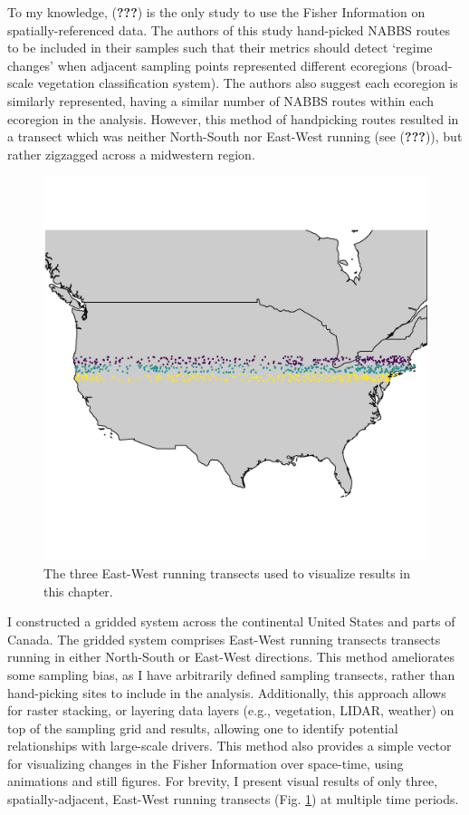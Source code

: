 \documentclass[12pt,twoside,openany]{reedthesis}
\begin{document}
To my knowledge, ({\textbf{???}}) is the only study to use the Fisher
Information on spatially-referenced data. The authors of this study
hand-picked NABBS routes to be included in their samples such that their
metrics should detect `regime changes' when adjacent sampling points
represented different ecoregions (broad-scale vegetation classification
system). The authors also suggest each ecoregion is similarly
represented, having a similar number of NABBS routes within each
ecoregion in the analysis. However, this method of handpicking routes
resulted in a transect which was neither North-South nor East-West
running (see ({\textbf{???}})), but rather zigzagged across a midwestern
region.
\begin{figure}
\includegraphics[width=0.85\linewidth]{./chapterFiles/fisherSpatial/figures/figsCalledInDiss/transectSamplingALlRoutesUsed} \caption{The three East-West running transects used to visualize results in this chapter.}\label{fig:ewRoutesUsedHere}
\end{figure}
I constructed a gridded system across the continental United States and
parts of Canada. The gridded system comprises East-West running
transects transects running in either North-South or East-West
directions. This method ameliorates some sampling bias, as I have
arbitrarily defined sampling transects, rather than hand-picking sites
to include in the analysis. Additionally, this approach allows for
raster stacking, or layering data layers (e.g., vegetation, LIDAR,
weather) on top of the sampling grid and results, allowing one to
identify potential relationships with large-scale drivers. This method
also provides a simple vector for visualizing changes in the Fisher
Information over space-time, using animations and still figures. For
brevity, I present visual results of only three, spatially-adjacent,
East-West running transects (Fig. \ref{fig:ewRoutesUsedHere}) at
multiple time periods.
\end{document}
